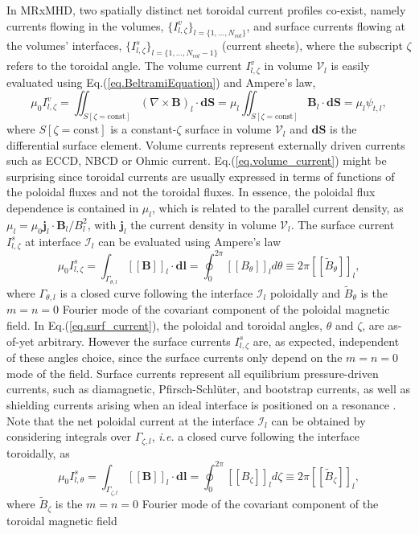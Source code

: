 \documentclass[my_thesis.tex]{subfiles}
\begin{document}
In \ac{MRxMHD}, two spatially distinct net toroidal current profiles co-exist, namely currents flowing in the volumes, $\{I^v_{l,\zeta}\}_{l=\{1,\ldots,N_{vol}\}}$, and surface currents flowing at the volumes' interfaces, $\{I^s_{l,\zeta}\}_{l=\{1,\ldots,N_{vol}-1\}}$ (current sheets), where the subscript $\zeta$ refers to the toroidal angle. The volume current $I^v_{l,\zeta}$ in volume $\mathcal{V}_l$ is easily evaluated using Eq.(\ref{eq.BeltramiEquation}) and Ampere's law,
\begin{equation}
    \mu_0I^v_{l,\zeta} = \iint_{S[\zeta=\text{const}]} (\nabla\times\mathbf{B})_l\cdot \mathbf{dS} = \mu_l\iint_{S[\zeta=\text{const}]} \mathbf{B}_l\cdot\mathbf{dS} = \mu_l \psi_{t,l},
    \label{eq.volume_current}
\end{equation}
where $S[\zeta=\text{const}]$ is a constant-$\zeta$ surface in volume $\mathcal{V}_l$ and $\mathbf{dS}$ is the differential surface element. Volume currents represent externally driven currents such as \ac{ECCD}, \ac{NBCD} or Ohmic current. Eq.(\ref{eq.volume_current}) might be surprising since toroidal currents are usually expressed in terms of functions of the poloidal fluxes and not the toroidal fluxes. In essence, the poloidal flux dependence is contained in $\mu_l$, which is related to the parallel current density, as $\mu_l = \mu_0 \mathbf{j}_l\cdot\mathbf{B}_l / B_l^2$, with $\mathbf{j}_l$ the current density in volume $\mathcal{V}_l$. The surface current $I^s_{l,\zeta}$ at interface $\mathcal{I}_l$ can be evaluated using Ampere's law
\begin{equation}
    \mu_0I^s_{l,\zeta} = \int_{\Gamma_{\theta,l}} \left[\left[ \mathbf{B} \right]\right]_l \cdot \mathbf{dl} = \oint_0^{2\pi} \left[\left[B_\theta\right]\right] _ld\theta \equiv 2\pi \left[\left[ \tilde{B}_{\theta} \right]\right]_l, \label{eq.surf_current}
\end{equation}
where $\Gamma_{\theta,l}$ is a closed curve following the interface $\mathcal{I}_l$ poloidally and $\tilde{B}_{\theta}$ is the $m=n=0$ Fourier mode of the covariant component of the poloidal magnetic field. In Eq.(\ref{eq.surf_current}), the poloidal and toroidal angles, $\theta$ and $\zeta$, are as-of-yet arbitrary. However the surface currents $I^s_{l,\zeta}$ are, as expected, independent of these angles choice, since the surface currents only depend on the $m=n=0$ mode of the field. Surface currents represent all equilibrium pressure-driven currents, such as diamagnetic, Pfirsch-Schl\"uter, and bootstrap currents, as well as shielding currents arising when an ideal interface is positioned on a resonance \citep{Loizu2015}. Note that the net poloidal current at the interface $\mathcal{I}_l$ can be obtained by considering integrals over $\Gamma_{\zeta,l}$, \textit{i.e.} a closed curve following the interface toroidally, as
\begin{equation}
    \mu_0I^s_{l,\theta} = \int_{\Gamma_{\zeta,l}} \left[\left[ \mathbf{B} \right]\right]_l \cdot \mathbf{dl} = \oint_0^{2\pi} \left[\left[B_\zeta\right]\right]_ld\zeta \equiv 2\pi \left[\left[ \tilde{B}_{\zeta} \right]\right]_l, \label{eq.surf_current_poloidal}	
\end{equation}
where $\tilde{B}_{\zeta}$ is the $m=n=0$ Fourier mode of the covariant component of the toroidal magnetic field
\end{document}
